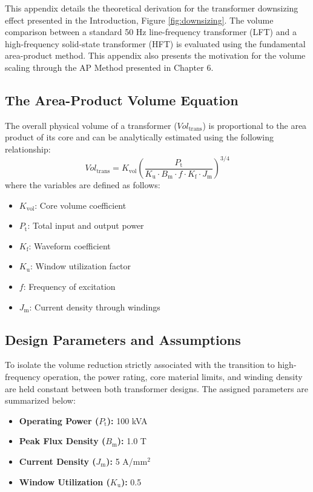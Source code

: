 This appendix details the theoretical derivation for the transformer downsizing effect presented in the Introduction, Figure \ref{fig:downsizing}. The volume comparison between a standard 50 Hz line-frequency transformer (LFT) and a high-frequency solid-state transformer (HFT) is evaluated using the fundamental area-product method. This appendix also presents the motivation for the volume scaling through the AP Method presented in Chapter 6.

\subsection*{The Area-Product Volume Equation}
The overall physical volume of a transformer ($Vol_{\mathrm{trans}}$) is proportional to the area product of its core and can be analytically estimated using the following relationship:
$$ Vol_{\mathrm{trans}} = K_{\mathrm{vol}} \left( \frac{P_{\mathrm{t}}}{K_{\mathrm{u}} \cdot B_{\mathrm{m}} \cdot f \cdot K_{\mathrm{f}} \cdot J_{\mathrm{m}}} \right)^{3/4} $$
where the variables are defined as follows:
\begin{itemize}
    \item $K_{\mathrm{vol}}$: Core volume coefficient
    \item $P_{\mathrm{t}}$: Total input and output power
    \item $K_{\mathrm{f}}$: Waveform coefficient
    \item $K_{\mathrm{u}}$: Window utilization factor
    \item $f$: Frequency of excitation
    \item $J_{\mathrm{m}}$: Current density through windings
\end{itemize}

\subsection*{Design Parameters and Assumptions}
To isolate the volume reduction strictly associated with the transition to high-frequency operation, the power rating, core material limits, and winding density are held constant between both transformer designs. The assigned parameters are summarized below:
\begin{itemize}
    \item \textbf{Operating Power ($P_{\mathrm{t}}$):} 100 kVA
    \item \textbf{Peak Flux Density ($B_{\mathrm{m}}$):} 1.0 T
    \item \textbf{Current Density ($J_{\mathrm{m}}$):} 5 A/mm$^2$
    \item \textbf{Window Utilization ($K_{\mathrm{u}}$):} 0.5
\end{itemize}

